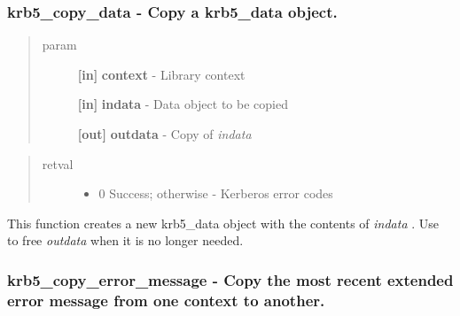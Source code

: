 \documentclass[letterpaper,10pt,english]{sphinxmanual}
\begin{document}
\subsubsection{krb5\_copy\_data -  Copy a krb5\_data object.}
\label{appdev/refs/api/krb5_copy_data:krb5-copy-data-copy-a-krb5-data-object}\label{appdev/refs/api/krb5_copy_data::doc}

\begin{fulllineitems}
\label{appdev/refs/api/krb5_copy_data:c.krb5_copy_data}
\end{fulllineitems}

\begin{quote}\begin{description}
\item[{param}] \leavevmode
\textbf{{[}in{]}} \textbf{context} - Library context

\textbf{{[}in{]}} \textbf{indata} - Data object to be copied

\textbf{{[}out{]}} \textbf{outdata} - Copy of \emph{indata}

\end{description}\end{quote}
\begin{quote}\begin{description}
\item[{retval}] \leavevmode\begin{itemize}
\item {} 
0   Success; otherwise - Kerberos error codes

\end{itemize}

\end{description}\end{quote}

This function creates a new krb5\_data object with the contents of \emph{indata} . Use {\hyperref[appdev/refs/api/krb5_free_data:c.krb5_free_data]{}} to free \emph{outdata} when it is no longer needed.


\subsubsection{krb5\_copy\_error\_message -  Copy the most recent extended error message from one context to another.}
\label{appdev/refs/api/krb5_copy_error_message:krb5-copy-error-message-copy-the-most-recent-extended-error-message-from-one-context-to-another}\label{appdev/refs/api/krb5_copy_error_message::doc}
\end{document}

